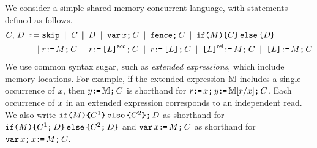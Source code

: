 We consider a simple shared-memory concurrent language, with statements
defined as follows.
\begin{align*}
\aCmd,\,\bCmd
\BNFDEF& \SKIP
\BNFSEP \aCmd \PAR \bCmd
\BNFSEP \VAR\aLoc\SEMI \aCmd
\BNFSEP \FENCE\SEMI \aCmd
\BNFSEP \IF{\aExp} \THEN \aCmd \ELSE \bCmd \FI
\\
\BNFSEP& \aReg\GETS\aExp\SEMI \aCmd
\BNFSEP \aReg\GETS\REF{\cExp}\ACQ\SEMI \aCmd 
\BNFSEP \aReg\GETS\REF{\cExp}\SEMI \aCmd
\BNFSEP \REF{\cExp}\REL\GETS\aExp\SEMI \aCmd
\BNFSEP \REF{\cExp}\GETS\aExp\SEMI \aCmd
\end{align*}
We use common syntax sugar, such as \emph{extended expressions}, which include
memory locations.  For example, if the extended expression $\aEExp$ includes
a single occurrence of $\aLoc$, then $\bLoc\GETS\aEExp\SEMI \aCmd$ is
shorthand for $\aReg\GETS\aLoc\SEMI\bLoc\GETS\aEExp[\aReg/\aLoc]\SEMI \aCmd$.
Each occurrence of $\aLoc$ in an extended expression corresponds to an
independent read.  We also write
$\IF{\aExp} \THEN \aCmd^1 \ELSE \aCmd^2 \FI \SEMI \bCmd$ as shorthand for
$\IF{\aExp} \THEN \aCmd^1 \SEMI \bCmd\ELSE \aCmd^2 \SEMI \bCmd\FI$ and
$\VAR\aLoc\GETS\aExp\SEMI \aCmd$ as shorthand for
$\VAR\aLoc\SEMI\aLoc\GETS\aExp\SEMI \aCmd$.

